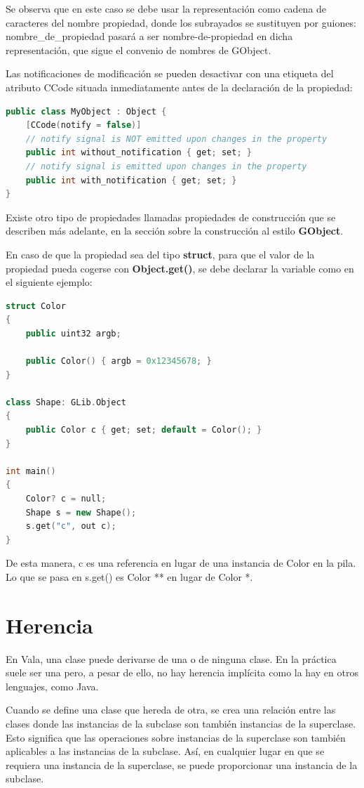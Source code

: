 \documentclass[12pt,twoside]{book}
\begin{document}
Se observa que en este caso se debe usar la representación como cadena de caracteres del nombre propiedad, donde los subrayados se sustituyen por guiones: nombre\_de\_propiedad pasará a ser nombre-de-propiedad en dicha representación, que sigue el convenio de nombres de GObject.

Las notificaciones de modificación se pueden desactivar con una etiqueta del atributo CCode situada inmediatamente antes de la declaración de la propiedad:

\begin{lstlisting}[language=C++]
public class MyObject : Object {
	[CCode(notify = false)]
	// notify signal is NOT emitted upon changes in the property
	public int without_notification { get; set; }
	// notify signal is emitted upon changes in the property
	public int with_notification { get; set; }
}
\end{lstlisting}


Existe otro tipo de propiedades llamadas propiedades de construcción que se describen más adelante, en la sección sobre la construcción al estilo \textbf{GObject}.

En caso de que la propiedad sea del tipo \textbf{struct}, para que el valor de la propiedad pueda cogerse con \textbf{Object.get()}, se debe declarar la variable como en el siguiente ejemplo:

\begin{lstlisting}[language=C++]
struct Color
{
	public uint32 argb;
	
	public Color() { argb = 0x12345678; }
}

class Shape: GLib.Object
{
	public Color c { get; set; default = Color(); }
}

int main()
{
	Color? c = null;
	Shape s = new Shape();
	s.get("c", out c);
}
\end{lstlisting}


De esta manera, c es una referencia en lugar de una instancia de Color en la pila. Lo que se pasa en s.get() es Color ** en lugar de Color *.

\section{Herencia}

En Vala, una clase puede derivarse de una o de ninguna clase. En la práctica suele ser una pero, a pesar de ello, no hay herencia implícita como la hay en otros lenguajes, como Java.

Cuando se define una clase que hereda de otra, se crea una relación entre las clases donde las instancias de la subclase son también instancias de la superclase. Esto significa que las operaciones sobre instancias de la superclase son también aplicables a las instancias de la subclase. Así, en cualquier lugar en que se requiera una instancia de la superclase, se puede proporcionar una instancia de la subclase.
\end{document}
